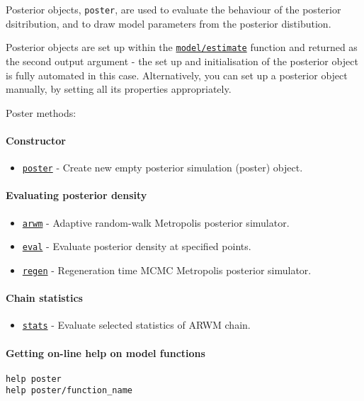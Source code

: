 

	Posterior objects, \texttt{poster}, are used to evaluate the behaviour
of the posterior dsitribution, and to draw model parameters from the
posterior distibution.

Posterior objects are set up within the
\href{model/estimate}{\texttt{model/estimate}} function and returned as
the second output argument - the set up and initialisation of the
posterior object is fully automated in this case. Alternatively, you can
set up a posterior object manually, by setting all its properties
appropriately.

Poster methods:

\paragraph{Constructor}\label{constructor}

\begin{itemize}
\itemsep1pt\parskip0pt
\item
  \href{poster/poster}{\texttt{poster}} - Create new empty posterior
  simulation (poster) object.
\end{itemize}

\paragraph{Evaluating posterior
density}\label{evaluating-posterior-density}

\begin{itemize}
\itemsep1pt\parskip0pt
\item
  \href{poster/arwm}{\texttt{arwm}} - Adaptive random-walk Metropolis
  posterior simulator.
\item
  \href{poster/eval}{\texttt{eval}} - Evaluate posterior density at
  specified points.
\item
  \href{poster/regen}{\texttt{regen}} - Regeneration time MCMC
  Metropolis posterior simulator.
\end{itemize}

\paragraph{Chain statistics}\label{chain-statistics}

\begin{itemize}
\itemsep1pt\parskip0pt
\item
  \href{poster/stats}{\texttt{stats}} - Evaluate selected statistics of
  ARWM chain.
\end{itemize}

\paragraph{Getting on-line help on model
functions}\label{getting-on-line-help-on-model-functions}

\begin{verbatim}
help poster
help poster/function_name
\end{verbatim}




